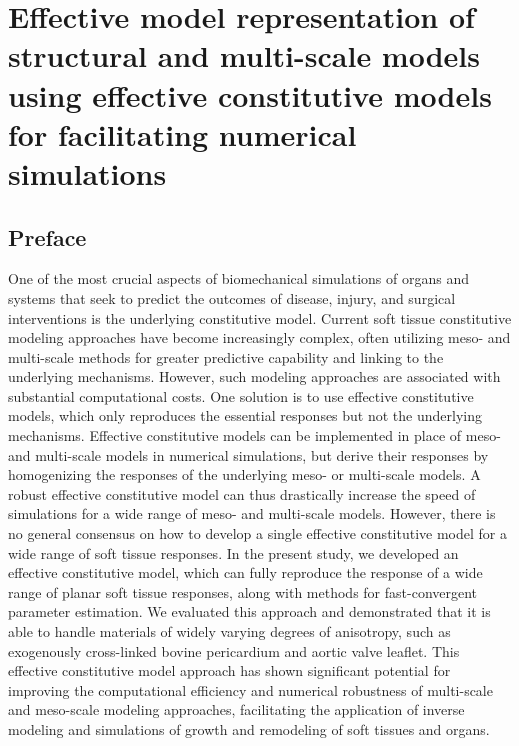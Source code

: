 \chapter{Effective model representation of structural and multi-scale models using effective constitutive models for facilitating numerical simulations}

\section*{Preface}
%

One of the most crucial aspects of biomechanical simulations of organs and systems that seek to predict the outcomes of disease, injury, and surgical interventions is the underlying constitutive model. Current soft tissue constitutive modeling approaches have become increasingly complex, often utilizing meso- and multi-scale methods for greater predictive capability and linking to the underlying mechanisms. However, such modeling approaches are associated with substantial computational costs. One solution is to use effective constitutive models, which only reproduces the essential responses but not the underlying mechanisms. Effective constitutive models can be implemented in place of meso- and multi-scale models in numerical simulations, but derive their responses by homogenizing the responses of the underlying meso- or multi-scale models. A robust effective constitutive model can thus drastically increase the speed of simulations for a wide range of meso- and multi-scale models. However, there is no general consensus on how to develop a single effective constitutive model for a wide range of soft tissue responses. In the present study, we developed an effective constitutive model, which can fully reproduce the response of a wide range of planar soft tissue responses, along with methods for fast-convergent parameter estimation. We evaluated this approach and demonstrated that it is able to handle materials of widely varying degrees of anisotropy, such as exogenously cross-linked bovine pericardium and aortic valve leaflet. This effective constitutive model approach has shown significant potential for improving the computational efficiency and numerical robustness of multi-scale and meso-scale modeling approaches, facilitating the application of inverse modeling and simulations of growth and remodeling of soft tissues and organs.




